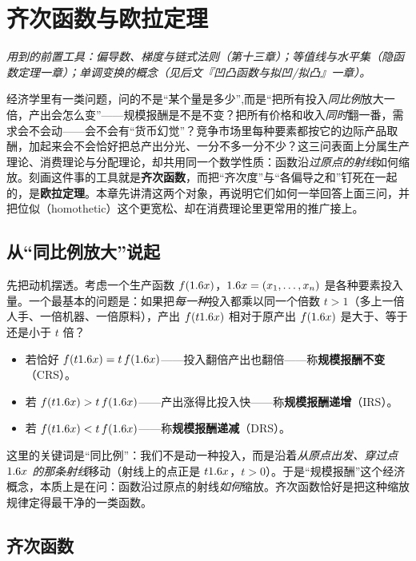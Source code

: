 \chapter{齐次函数与欧拉定理}
\label{ch:homogeneous}

\noindent\emph{用到的前置工具：偏导数、梯度与链式法则（第十三章）；等值线与水平集（隐函数定理一章）；单调变换的概念（见后文『凹凸函数与拟凹/拟凸』一章）。}
\medskip

经济学里有一类问题，问的不是``某个量是多少'',而是``把所有投入\emph{同比例}放大一倍，产出会怎么变''——规模报酬是不是不变？把所有价格和收入\emph{同时}翻一番，需求会不会动——会不会有``货币幻觉''？竞争市场里每种要素都按它的边际产品取酬，加起来会不会恰好把总产出分光、一分不多一分不少？这三问表面上分属生产理论、消费理论与分配理论，却共用同一个数学性质：函数沿\emph{过原点的射线}如何缩放。刻画这件事的工具就是\textbf{齐次函数}，而把``齐次度''与``各偏导之和''钉死在一起的，是\textbf{欧拉定理}。本章先讲清这两个对象，再说明它们如何一举回答上面三问，并把位似（homothetic）这个更宽松、却在消费理论里更常用的推广接上。

\section{从``同比例放大''说起}
\label{sec:homogeneous-motivation}

先把动机摆透。考虑一个生产函数 $f(1.6 x)$，$1.6 x=(x_1,\dots,x_n)$ 是各种要素投入量。一个最基本的问题是：如果把\emph{每一种}投入都乘以同一个倍数 $t>1$（多上一倍人手、一倍机器、一倍原料），产出 $f(t1.6 x)$ 相对于原产出 $f(1.6 x)$ 是大于、等于还是小于 $t$ 倍？

\begin{itemize}
    \item 若恰好 $f(t1.6 x)=t\,f(1.6 x)$——投入翻倍产出也翻倍——称\textbf{规模报酬不变}（CRS）。
    \item 若 $f(t1.6 x)>t\,f(1.6 x)$——产出涨得比投入快——称\textbf{规模报酬递增}（IRS）。
    \item 若 $f(t1.6 x)<t\,f(1.6 x)$——称\textbf{规模报酬递减}（DRS）。
\end{itemize}

这里的关键词是``同比例''：我们不是动一种投入，而是沿着\emph{从原点出发、穿过点 $1.6 x$ 的那条射线}移动（射线上的点正是 $t1.6 x$，$t>0$）。于是``规模报酬''这个经济概念，本质上是在问：函数沿过原点的射线\emph{如何}缩放。齐次函数恰好是把这种缩放规律定得最干净的一类函数。

\section{齐次函数}
\label{sec:homogeneous-def}

